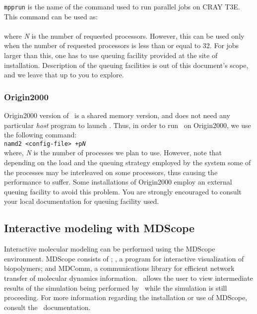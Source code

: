 {\tt mpprun} is the name of the command used to run parallel jobs on CRAY
T3E. This command can be used as:\\
\\
where {\em N} is the number of requested processors. However, this can be
used only when the number of requested processors is less than or equal
to 32. For jobs larger than this, one has to use queuing facility provided
at the site of installation. Description of the queuing facilities is out
of this document's scope, and we leave that up to you to explore.

\subsubsection{Origin2000}

Origin2000 version of \NAMD\ is a shared memory version, and does not need
any particular {\em host} program to launch \NAMD. Thus, in order to run
\NAMD\ on Origin2000, we use the following command:\\
{\tt namd2 <config-file> +p{\em N}}\\
where, {\em N} is the number of processes we plan to use. However, note that
depending on the load and the queuing strategy employed by the system some of
the processes may be interleaved on some processors, thus causing the
performance to suffer. Some installations of Origin2000 employ an external
queuing facility to avoid this problem. You are strongly encouraged to
consult your local documentation for queuing facility used.

\subsection{Interactive modeling with MDScope}

Interactive molecular modeling can be performed using the MDScope
environment.  MDScope consists of \NAMD; \VMD, a program for
interactive visualization of biopolymers; and MDComm, a communications
library for efficient network transfer of molecular dynamics
information.  \VMD\ allows the user to view intermediate results of the
simulation being performed by \NAMD\ while the simulation is still 
proceeding.  For more information regarding 
the installation or use of MDScope, 
consult the \VMD\ documentation.  


